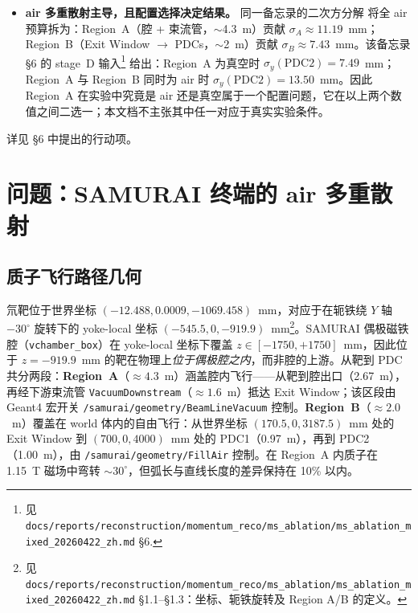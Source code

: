 \documentclass[a4paper, 11pt]{article}
\begin{document}
\begin{itemize}
  \item \textbf{air 多重散射主导，且配置选择决定结果。} 同一备忘录的二次方分解 将全 air 预算拆为：Region~A（腔 + 束流管，$\sim$4.3~m）贡献 $\sigma_A \approx 11.19$~mm；Region~B（Exit Window $\to$ PDCs，$\sim$2~m）贡献 $\sigma_B \approx 7.43$~mm。该备忘录 §6 的 stage~D 输入\footnote{见 \texttt{docs/reports/reconstruction/momentum\_reco/ms\_ablation/ms\_ablation\_mixed\_20260422\_zh.md} §6.} 给出：Region~A 为真空时 $\sigma_y(\text{PDC2}) = 7.49$~mm；Region~A 与 Region~B 同时为 air 时 $\sigma_y(\text{PDC2}) = 13.50$~mm。因此 Region~A 在实验中究竟是 air 还是真空属于一个配置问题，它在以上两个数值之间二选一；本文档不主张其中任一对应于真实实验条件。
\end{itemize}

详见 §6 中提出的行动项。

\section{问题：SAMURAI 终端的 air 多重散射}

\subsection{质子飞行路径几何}
氘靶位于世界坐标 $(-12.488, 0.0009, -1069.458)$~mm，对应于在轭铁绕 $Y$ 轴 $-30^\circ$ 旋转下的 yoke-local 坐标 $(-545.5, 0, -919.9)$~mm\footnote{\label{fn:msablation_geom}见 \texttt{docs/reports/reconstruction/momentum\_reco/ms\_ablation/ms\_ablation\_mixed\_20260422\_zh.md} §1.1--§1.3：坐标、轭铁旋转及 Region A/B 的定义。}。SAMURAI 偶极磁铁腔（\texttt{vchamber\_box}）在 yoke-local 坐标下覆盖 $z \in [-1750, +1750]$~mm，因此位于 $z=-919.9$~mm 的靶在物理上\emph{位于偶极腔之内}，而非腔的上游。从靶到 PDC 共分两段：\textbf{Region~A}（$\approx 4.3$~m）涵盖腔内飞行——从靶到腔出口（2.67~m），再经下游束流管 \texttt{VacuumDownstream}（$\approx 1.6$~m）抵达 Exit Window；该区段由 Geant4 宏开关 \texttt{/samurai/geometry/BeamLineVacuum} 控制。\textbf{Region~B}（$\approx 2.0$~m）覆盖在 world 体内的自由飞行：从世界坐标 $(170.5, 0, 3187.5)$~mm 处的 Exit Window 到 $(700, 0, 4000)$~mm 处的 PDC1（0.97~m），再到 PDC2（1.00~m），由 \texttt{/samurai/geometry/FillAir} 控制。在 Region~A 内质子在 1.15~T 磁场中弯转 $\sim 30^\circ$，但弧长与直线长度的差异保持在 10\% 以内。
\end{document}
